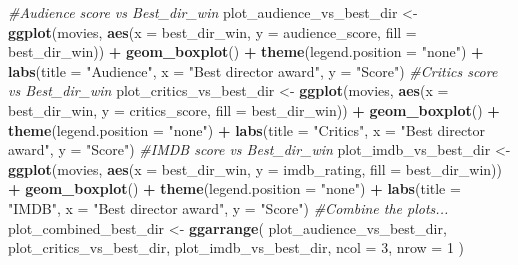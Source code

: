 \documentclass[]{article}
\newenvironment{Shaded}{\begin{snugshade}}{\end{snugshade}}
\newcommand{\CommentTok}[1]{\textcolor[rgb]{0.56,0.35,0.01}{\textit{#1}}}
\newcommand{\DataTypeTok}[1]{\textcolor[rgb]{0.13,0.29,0.53}{#1}}
\newcommand{\DecValTok}[1]{\textcolor[rgb]{0.00,0.00,0.81}{#1}}
\newcommand{\KeywordTok}[1]{\textcolor[rgb]{0.13,0.29,0.53}{\textbf{#1}}}
\newcommand{\NormalTok}[1]{#1}
\newcommand{\OperatorTok}[1]{\textcolor[rgb]{0.81,0.36,0.00}{\textbf{#1}}}
\newcommand{\StringTok}[1]{\textcolor[rgb]{0.31,0.60,0.02}{#1}}
\begin{document}
\begin{Shaded}
\begin{Highlighting}[]
\CommentTok{#Audience score vs Best_dir_win}
\NormalTok{plot_audience_vs_best_dir <-}
\StringTok{  }\KeywordTok{ggplot}\NormalTok{(movies,}
         \KeywordTok{aes}\NormalTok{(}\DataTypeTok{x =}\NormalTok{ best_dir_win, }\DataTypeTok{y =}\NormalTok{ audience_score, }\DataTypeTok{fill =}\NormalTok{ best_dir_win)) }\OperatorTok{+}\StringTok{ }\KeywordTok{geom_boxplot}\NormalTok{() }\OperatorTok{+}\StringTok{ }\KeywordTok{theme}\NormalTok{(}\DataTypeTok{legend.position =} \StringTok{"none"}\NormalTok{) }\OperatorTok{+}\StringTok{ }\KeywordTok{labs}\NormalTok{(}\DataTypeTok{title =} \StringTok{"Audience"}\NormalTok{, }\DataTypeTok{x =} \StringTok{"Best director award"}\NormalTok{, }\DataTypeTok{y =} \StringTok{"Score"}\NormalTok{)}
\CommentTok{#Critics score vs Best_dir_win}
\NormalTok{plot_critics_vs_best_dir <-}
\StringTok{  }\KeywordTok{ggplot}\NormalTok{(movies,}
         \KeywordTok{aes}\NormalTok{(}\DataTypeTok{x =}\NormalTok{ best_dir_win, }\DataTypeTok{y =}\NormalTok{ critics_score, }\DataTypeTok{fill =}\NormalTok{ best_dir_win)) }\OperatorTok{+}\StringTok{ }\KeywordTok{geom_boxplot}\NormalTok{() }\OperatorTok{+}\StringTok{ }\KeywordTok{theme}\NormalTok{(}\DataTypeTok{legend.position =} \StringTok{"none"}\NormalTok{) }\OperatorTok{+}\StringTok{ }\KeywordTok{labs}\NormalTok{(}\DataTypeTok{title =} \StringTok{"Critics"}\NormalTok{, }\DataTypeTok{x =} \StringTok{"Best director award"}\NormalTok{, }\DataTypeTok{y =} \StringTok{"Score"}\NormalTok{)}
\CommentTok{#IMDB score vs Best_dir_win}
\NormalTok{plot_imdb_vs_best_dir <-}
\StringTok{  }\KeywordTok{ggplot}\NormalTok{(movies, }\KeywordTok{aes}\NormalTok{(}\DataTypeTok{x =}\NormalTok{ best_dir_win, }\DataTypeTok{y =}\NormalTok{ imdb_rating, }\DataTypeTok{fill =}\NormalTok{ best_dir_win)) }\OperatorTok{+}
\StringTok{  }\KeywordTok{geom_boxplot}\NormalTok{() }\OperatorTok{+}\StringTok{ }\KeywordTok{theme}\NormalTok{(}\DataTypeTok{legend.position =} \StringTok{"none"}\NormalTok{) }\OperatorTok{+}\StringTok{ }\KeywordTok{labs}\NormalTok{(}\DataTypeTok{title =} \StringTok{"IMDB"}\NormalTok{, }\DataTypeTok{x =} \StringTok{"Best director award"}\NormalTok{, }\DataTypeTok{y =} \StringTok{"Score"}\NormalTok{)}
\CommentTok{#Combine the plots...}
\NormalTok{plot_combined_best_dir <-}
\StringTok{  }\KeywordTok{ggarrange}\NormalTok{(}
\NormalTok{    plot_audience_vs_best_dir,}
\NormalTok{    plot_critics_vs_best_dir,}
\NormalTok{    plot_imdb_vs_best_dir,}
    \DataTypeTok{ncol =} \DecValTok{3}\NormalTok{,}
    \DataTypeTok{nrow =} \DecValTok{1}
\NormalTok{  )}


\end{Highlighting}
\end{Shaded}
\end{document}
